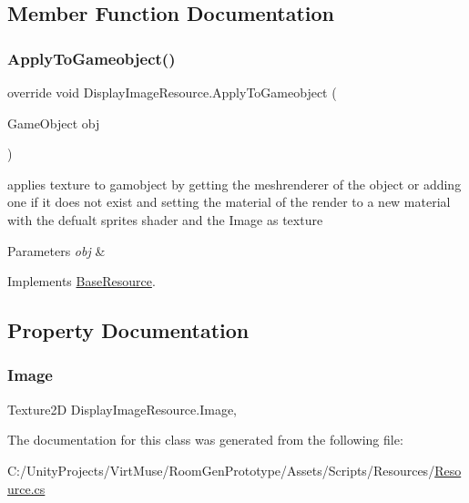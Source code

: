 \subsection{Member Function Documentation}
\mbox{\label{class_display_image_resource_a26992a5ecb6c449d85539cc5d07112e2}} 
\subsubsection{\texorpdfstring{Apply\+To\+Gameobject()}{ApplyToGameobject()}}
{\footnotesize\ttfamily override void Display\+Image\+Resource.\+Apply\+To\+Gameobject (\begin{DoxyParamCaption}\item[{Game\+Object}]{obj }\end{DoxyParamCaption})\hspace{0.3cm}{\ttfamily [virtual]}}



applies texture to gamobject by getting the meshrenderer of the object or adding one if it does not exist and setting the material of the render to a new material with the defualt sprites shader and the Image as texture 


\begin{DoxyParams}{Parameters}
{\em obj} & \\
\hline
\end{DoxyParams}


Implements \mbox{\hyperlink{class_base_resource_a2d832c8042114da9e3f6240651d59703}{Base\+Resource}}.



\subsection{Property Documentation}
\mbox{\label{class_display_image_resource_a6268f6612b7c533eafc2b6c8f91c2925}} 
\subsubsection{\texorpdfstring{Image}{Image}}
{\footnotesize\ttfamily Texture2D Display\+Image\+Resource.\+Image\hspace{0.3cm}{\ttfamily [get]}, {\ttfamily [set]}}



The documentation for this class was generated from the following file\+:\begin{DoxyCompactItemize}
\item 
C\+:/\+Unity\+Projects/\+Virt\+Muse/\+Room\+Gen\+Prototype/\+Assets/\+Scripts/\+Resources/\mbox{\hyperlink{_resource_8cs}{Resource.\+cs}}\end{DoxyCompactItemize}

